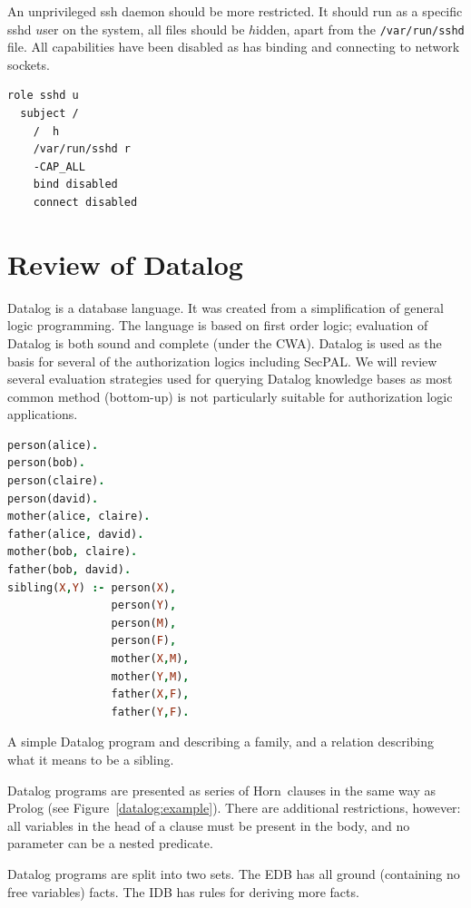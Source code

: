 \documentclass[a4paper]{article}
\begin{document}
An unprivileged ssh daemon should be more restricted.  It should run as a
specific sshd $u$ser on the system, all files should be $h$idden, apart from the
\texttt{/var/run/sshd} file.  All capabilities have been disabled as has binding
and connecting to network sockets.

\begin{lstlisting}[language=grsec]
role sshd u
  subject /
    /  h
    /var/run/sshd r
    -CAP_ALL
    bind disabled
    connect disabled
\end{lstlisting}
\section{Review of Datalog}
\label{sec:datalog}

Datalog is a database language. It was created from a simplification of general
logic programming.  The language is based on first order logic; evaluation of
Datalog is both sound and complete (under the \ac{CWA}).  Datalog is used as the
basis for several of the authorization logics including SecPAL. We will review
several evaluation strategies used for querying Datalog knowledge bases as most
common method (bottom-up) is not particularly suitable for authorization logic
applications.

\begin{marginfigure}
  \label{datalog:example}
  \begin{lstlisting}[language=Prolog]
person(alice).  
person(bob).
person(claire). 
person(david).
mother(alice, claire).
father(alice, david).
mother(bob, claire).
father(bob, david).
sibling(X,Y) :- person(X),
                person(Y),
                person(M),   
                person(F),
                mother(X,M),
                mother(Y,M), 
                father(X,F), 
                father(Y,F).
  \end{lstlisting}
  \caption{A simple Datalog program and describing a family, and a relation
  describing what it means to be a sibling.}
\end{marginfigure}

Datalog programs are presented as series of Horn~clauses in the
same way as Prolog (see Figure~\ref{datalog:example}).  There are
additional restrictions, however: all variables in the head of a clause
must be present in the body, and no parameter can be a nested predicate.

Datalog programs are split into two sets.
The \ac{EDB} has all ground (containing no free variables) facts.
The \ac{IDB} has rules for deriving more facts.
\end{document}
